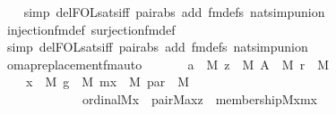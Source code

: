 \begin{isabellebody}
\ \ \isamarkupfalse%
\ {\isacharparenleft}{\kern0pt}simp\ del{\isacharcolon}{\kern0pt}FOL{\isacharunderscore}{\kern0pt}sats{\isacharunderscore}{\kern0pt}iff\ pair{\isacharunderscore}{\kern0pt}abs\ add{\isacharcolon}{\kern0pt}\ fm{\isacharunderscore}{\kern0pt}defs\ nat{\isacharunderscore}{\kern0pt}simp{\isacharunderscore}{\kern0pt}union{\isacharparenright}{\kern0pt}\isanewline
\ \ \isamarkupfalse%
\ injection{\isacharunderscore}{\kern0pt}fm{\isacharunderscore}{\kern0pt}def\ surjection{\isacharunderscore}{\kern0pt}fm{\isacharunderscore}{\kern0pt}def\isanewline
\ \ \isamarkupfalse%
\ {\isacharparenleft}{\kern0pt}simp\ del{\isacharcolon}{\kern0pt}FOL{\isacharunderscore}{\kern0pt}sats{\isacharunderscore}{\kern0pt}iff\ pair{\isacharunderscore}{\kern0pt}abs\ add{\isacharcolon}{\kern0pt}\ fm{\isacharunderscore}{\kern0pt}defs\ nat{\isacharunderscore}{\kern0pt}simp{\isacharunderscore}{\kern0pt}union{\isacharparenright}{\kern0pt}\isanewline
\ \ \isamarkupfalse%
%
\endisatagproof
{\isafoldproof}%
%
\isadelimproof
\isanewline
%
\endisadelimproof
\isanewline
{}\isamarkupfalse%
\ omap{\isacharunderscore}{\kern0pt}replacement{\isacharunderscore}{\kern0pt}fm{\isacharunderscore}{\kern0pt}auto{\isacharcolon}{\kern0pt}\isanewline
\ \ \isanewline
\ \ \ \ {\isachardoublequoteopen}a\ {\isasymin}\ M{\isachardoublequoteclose}\ {\isachardoublequoteopen}z\ {\isasymin}\ M{\isachardoublequoteclose}\ {\isachardoublequoteopen}A\ {\isasymin}\ M{\isachardoublequoteclose}\ {\isachardoublequoteopen}r\ {\isasymin}\ M{\isachardoublequoteclose}\ \isanewline
\ \ \isanewline
\ \ \ \ {\isachardoublequoteopen}{\isacharparenleft}{\kern0pt}{\isasymexists}x\ {\isasymin}\ M{\isachardot}{\kern0pt}\ {\isasymexists}g\ {\isasymin}\ M{\isachardot}{\kern0pt}\ {\isasymexists}mx\ {\isasymin}\ M{\isachardot}{\kern0pt}\ {\isasymexists}par\ {\isasymin}\ M{\isachardot}{\kern0pt}\isanewline
\ \ \ \ \ \ \ \ \ \ \ \ \ ordinal{\isacharparenleft}{\kern0pt}{\isacharhash}{\kern0pt}{\isacharhash}{\kern0pt}M{\isacharcomma}{\kern0pt}x{\isacharparenright}{\kern0pt}\ {\isasymand}\ pair{\isacharparenleft}{\kern0pt}{\isacharhash}{\kern0pt}{\isacharhash}{\kern0pt}M{\isacharcomma}{\kern0pt}a{\isacharcomma}{\kern0pt}x{\isacharcomma}{\kern0pt}z{\isacharparenright}{\kern0pt}\ {\isasymand}\ membership{\isacharparenleft}{\kern0pt}{\isacharhash}{\kern0pt}{\isacharhash}{\kern0pt}M{\isacharcomma}{\kern0pt}x{\isacharcomma}{\kern0pt}mx{\isacharparenright}{\kern0pt}\ {\isasymand}\isanewline

\end{isabellebody}
